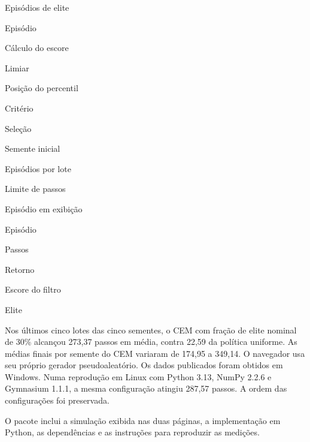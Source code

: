 Episódios de elite

Episódio

Cálculo do escore

Limiar

Posição do percentil

Critério

Seleção

Semente inicial

Episódios por lote

Limite de passos

Episódio em exibição

Episódio

Passos

Retorno

Escore do filtro

Elite

Nos últimos cinco lotes das cinco sementes, o CEM com fração de elite nominal de 30\% alcançou 273,37 passos em média, contra 22,59 da política uniforme. As médias finais por semente do CEM variaram de 174,95 a 349,14. O navegador usa seu próprio gerador pseudoaleatório. Os dados publicados foram obtidos em Windows. Numa reprodução em Linux com Python 3.13, NumPy 2.2.6 e Gymnasium 1.1.1, a mesma configuração atingiu 287,57 passos. A ordem das configurações foi preservada.

O pacote inclui a simulação exibida nas duas páginas, a implementação em Python, as dependências e as instruções para reproduzir as medições.
